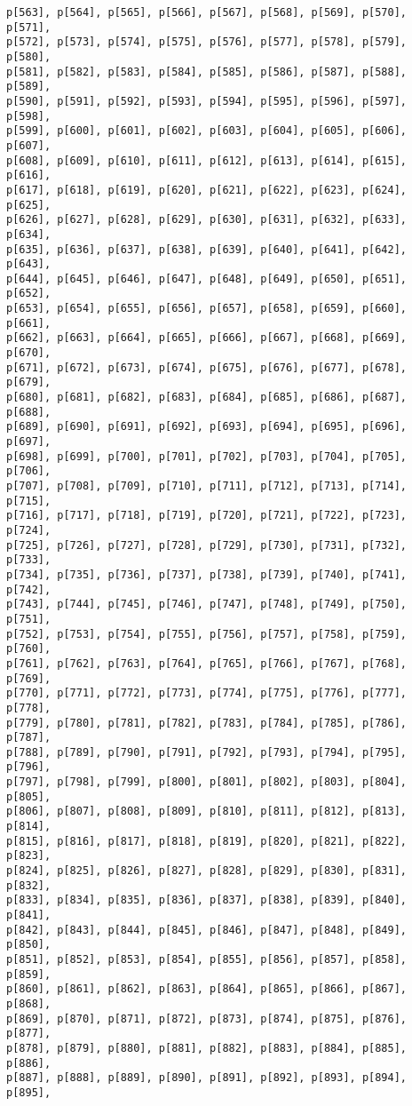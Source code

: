 \documentclass[
  letterpaper,
  DIV=11,
  numbers=noendperiod]{scrartcl}
\begin{document}
\begin{verbatim}
p[563], p[564], p[565], p[566], p[567], p[568], p[569], p[570], p[571],
p[572], p[573], p[574], p[575], p[576], p[577], p[578], p[579], p[580],
p[581], p[582], p[583], p[584], p[585], p[586], p[587], p[588], p[589],
p[590], p[591], p[592], p[593], p[594], p[595], p[596], p[597], p[598],
p[599], p[600], p[601], p[602], p[603], p[604], p[605], p[606], p[607],
p[608], p[609], p[610], p[611], p[612], p[613], p[614], p[615], p[616],
p[617], p[618], p[619], p[620], p[621], p[622], p[623], p[624], p[625],
p[626], p[627], p[628], p[629], p[630], p[631], p[632], p[633], p[634],
p[635], p[636], p[637], p[638], p[639], p[640], p[641], p[642], p[643],
p[644], p[645], p[646], p[647], p[648], p[649], p[650], p[651], p[652],
p[653], p[654], p[655], p[656], p[657], p[658], p[659], p[660], p[661],
p[662], p[663], p[664], p[665], p[666], p[667], p[668], p[669], p[670],
p[671], p[672], p[673], p[674], p[675], p[676], p[677], p[678], p[679],
p[680], p[681], p[682], p[683], p[684], p[685], p[686], p[687], p[688],
p[689], p[690], p[691], p[692], p[693], p[694], p[695], p[696], p[697],
p[698], p[699], p[700], p[701], p[702], p[703], p[704], p[705], p[706],
p[707], p[708], p[709], p[710], p[711], p[712], p[713], p[714], p[715],
p[716], p[717], p[718], p[719], p[720], p[721], p[722], p[723], p[724],
p[725], p[726], p[727], p[728], p[729], p[730], p[731], p[732], p[733],
p[734], p[735], p[736], p[737], p[738], p[739], p[740], p[741], p[742],
p[743], p[744], p[745], p[746], p[747], p[748], p[749], p[750], p[751],
p[752], p[753], p[754], p[755], p[756], p[757], p[758], p[759], p[760],
p[761], p[762], p[763], p[764], p[765], p[766], p[767], p[768], p[769],
p[770], p[771], p[772], p[773], p[774], p[775], p[776], p[777], p[778],
p[779], p[780], p[781], p[782], p[783], p[784], p[785], p[786], p[787],
p[788], p[789], p[790], p[791], p[792], p[793], p[794], p[795], p[796],
p[797], p[798], p[799], p[800], p[801], p[802], p[803], p[804], p[805],
p[806], p[807], p[808], p[809], p[810], p[811], p[812], p[813], p[814],
p[815], p[816], p[817], p[818], p[819], p[820], p[821], p[822], p[823],
p[824], p[825], p[826], p[827], p[828], p[829], p[830], p[831], p[832],
p[833], p[834], p[835], p[836], p[837], p[838], p[839], p[840], p[841],
p[842], p[843], p[844], p[845], p[846], p[847], p[848], p[849], p[850],
p[851], p[852], p[853], p[854], p[855], p[856], p[857], p[858], p[859],
p[860], p[861], p[862], p[863], p[864], p[865], p[866], p[867], p[868],
p[869], p[870], p[871], p[872], p[873], p[874], p[875], p[876], p[877],
p[878], p[879], p[880], p[881], p[882], p[883], p[884], p[885], p[886],
p[887], p[888], p[889], p[890], p[891], p[892], p[893], p[894], p[895],

\end{verbatim}
\end{document}
